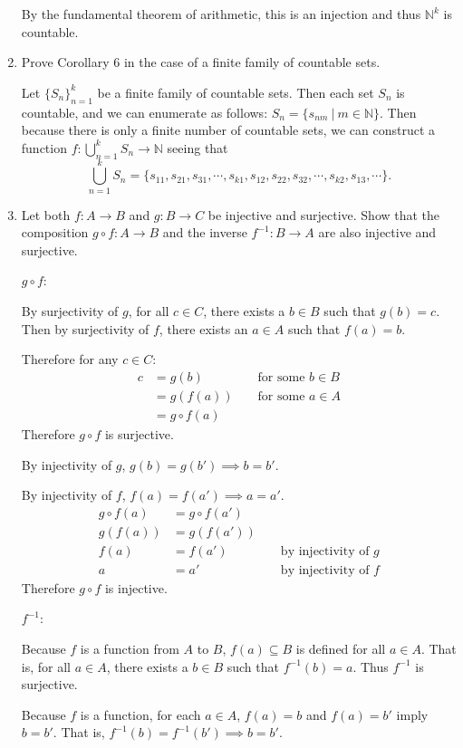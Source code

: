 \begin{enumerate}
	By the fundamental theorem of arithmetic, this is an injection and thus $\mathbb{N}^k$ is countable.
	\item Prove Corollary 6 in the case of a finite family of countable sets.\par
	Let $\{S_n\}_{n=1}^k$ be a finite family of countable sets.
	Then each set $S_n$ is countable, and we can enumerate as follows: $S_n = \{s_{nm} \ | \ m \in \mathbb{N} \}$.
	Then because there is only a finite number of countable sets, we can construct a function $f: \bigcup_{n=1}^k S_n \to \mathbb{N}$ seeing that 
	\[
	\bigcup_{n=1}^k S_n = \{s_{11},s_{21},s_{31},\cdots, s_{k1}, s_{12}, s_{22},s_{32},\cdots,s_{k2},s_{13}, \cdots \}.
	\]
	\item Let both $f:A \to B$ and $g:B \to C$ be injective and surjective. Show that the composition $g \circ f:A \to B$ and the inverse $f^{-1}:B \to A$ are also injective and surjective.\par
	$g \circ f$:\par
	By surjectivity of $g$, for all $c \in C$, there exists a $b \in B$ such that $g(b)=c$.
	Then by surjectivity of $f$, there exists an $a \in A$ such that $f(a)=b$.\par
	Therefore for any $c \in C$:
	\begin{align*}
		c & = g(b) && \text{ for some $b \in B$}\\
		& = g(f(a))&& \text{ for some $a \in A$}\\
		& =g \circ f (a)
	\end{align*}
	Therefore $g \circ f$ is surjective.\par
	By injectivity of $g$, $g(b)=g(b') \implies b = b'$.\par
	By injectivity of $f$, $f(a)=f(a') \implies a = a'$.
	\begin{align*}
		g \circ f (a) & = g \circ f (a')\\
		g(f(a)) & = g(f(a')) \\
		f(a) & = f(a')&& \text{ by injectivity of $g$}\\
		a & = a'&& \text{ by injectivity of $f$}
	\end{align*}
	Therefore $g \circ f$ is injective.
	\par
	$f^{-1}$:\par
	Because $f$ is a function from $A$ to $B$, $f(a) \subseteq B$ is defined for all $a \in A$.
	That is, for all $a \in A$, there exists a $b \in B$ such that $f^{-1}(b) = a$.
	Thus $f^{-1}$ is surjective.\par
	Because $f$ is a function, for each $a \in A$, $f(a)=b$ and $f(a)=b'$ imply $b=b'$. That is, $f^{-1}(b)=f^{-1}(b') \implies b=b'$.

\end{enumerate}
